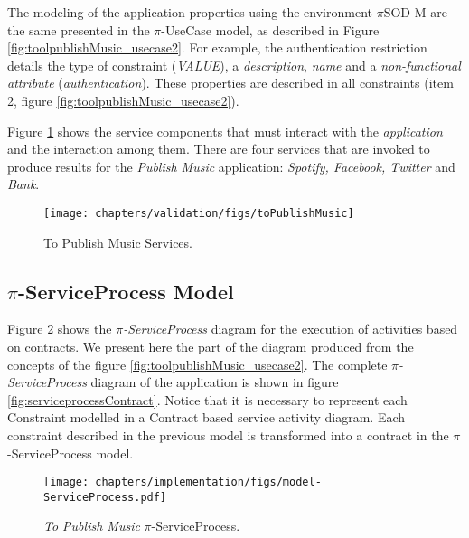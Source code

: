 The modeling of the application properties using the environment $\pi$SOD-M
are the same presented in the $\pi$-UseCase model, as described in Figure
\ref{fig:toolpublishMusic_usecase2}. For example, the authentication restriction
 details the type of constraint (\textit{VALUE}), a \textit{description},
 \textit{name} and a \textit{non-functional attribute}
 (\textit{authentication}). These properties are described in all constraints
 (item 2, figure \ref{fig:toolpublishMusic_usecase2}).

Figure \ref{fig:servicesToPublishMusic} shows the service components that must
interact with the \textit{application} and the interaction among them. There are
four services that are invoked to produce results for the \textit{Publish Music} application:
\textit{Spotify, Facebook, Twitter} and \textit{Bank}. 

\begin{figure}[ht!]   
\centering
\texttt{[image: chapters/validation/figs/toPublishMusic]}
\caption{To Publish Music Services.}
\label{fig:servicesToPublishMusic}
\end{figure}  


 \subsection{$\pi$-ServiceProcess Model}
\label{sec:serviceProcess_topublishMusic}


Figure \ref{fig:publishmusic_piserviceProcessToolModelProperties} shows the
\textit{$\pi$-ServiceProcess} diagram for the execution of activities based on
contracts. We present here the part of the diagram produced from the concepts of the figure
\ref{fig:toolpublishMusic_usecase2}. The complete \textit{$\pi$-ServiceProcess}
diagram of the application is shown in figure \ref{fig:serviceprocessContract}.
Notice that it is necessary to represent each {\sc Constraint} modelled in a {\sc Contract} based service activity diagram. Each constraint
described in the previous model is transformed into a contract in the
$\pi$-ServiceProcess model.

\begin{figure}[ht!]
\centering
\texttt{[image: chapters/implementation/figs/model-ServiceProcess.pdf]}
\caption{\textit{To Publish Music} $\pi$-ServiceProcess.}
\label{fig:publishmusic_piserviceProcessToolModelProperties}
\end{figure} 

